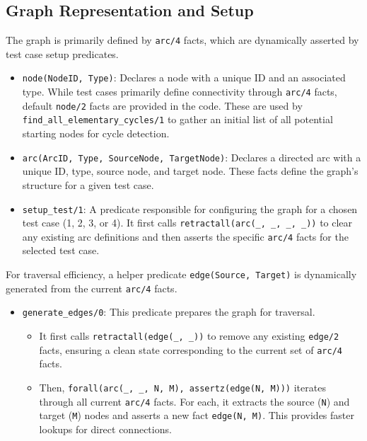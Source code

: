 \documentclass[12pt,a4paper]{article}
\begin{document}
\subsection{Graph Representation and Setup}
The graph is primarily defined by \texttt{arc/4} facts, which are dynamically asserted by test case setup predicates.
\begin{itemize}
\item \texttt{node(NodeID, Type)}: Declares a node with a unique ID and an associated type. While test cases primarily define connectivity through \texttt{arc/4} facts, default \texttt{node/2} facts are provided in the code. These are used by \texttt{find\_all\_elementary\_cycles/1} to gather an initial list of all potential starting nodes for cycle detection.
\item \texttt{arc(ArcID, Type, SourceNode, TargetNode)}: Declares a directed arc with a unique ID, type, source node, and target node. These facts define the graph's structure for a given test case.
\item \texttt{setup\_test/1}: A predicate responsible for configuring the graph for a chosen test case (1, 2, 3, or 4). It first calls \texttt{retractall(arc(\_, \_, \_, \_))} to clear any existing arc definitions and then asserts the specific \texttt{arc/4} facts for the selected test case.
\end{itemize}
For traversal efficiency, a helper predicate \texttt{edge(Source, Target)} is dynamically generated from the current \texttt{arc/4} facts.
\begin{itemize}
\item \texttt{generate\_edges/0}: This predicate prepares the graph for traversal.
\begin{itemize}
\item It first calls \texttt{retractall(edge(\_, \_))} to remove any existing \texttt{edge/2} facts, ensuring a clean state corresponding to the current set of \texttt{arc/4} facts.
\item Then, \texttt{forall(arc(\_, \_, N, M), assertz(edge(N, M)))} iterates through all current \texttt{arc/4} facts. For each, it extracts the source (\texttt{N}) and target (\texttt{M}) nodes and asserts a new fact \texttt{edge(N, M)}. This provides faster lookups for direct connections.
\end{itemize}
\end{itemize}
\end{document}
